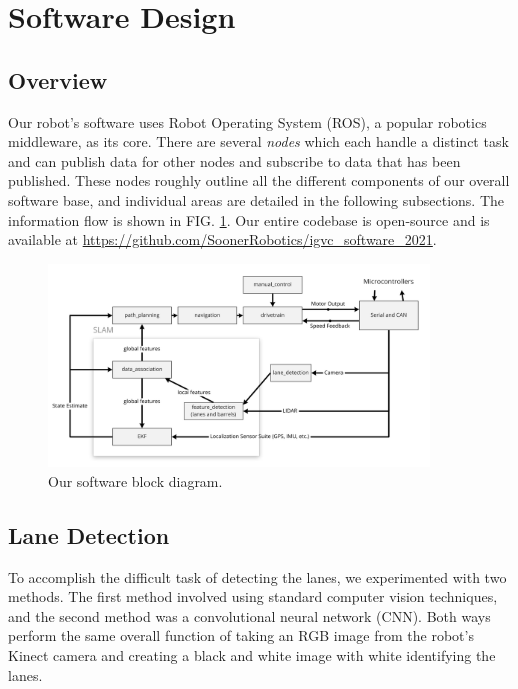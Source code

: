 \section{Software Design}

\subsection{Overview}

Our robot's software uses Robot Operating System (ROS), a popular robotics middleware, as its core. There are several \textit{nodes} which each handle a distinct task and can publish data for other nodes and subscribe to data that has been published. These nodes roughly outline all the different components of our overall software base, and individual areas are detailed in the following subsections. The information flow is shown in FIG. \ref{fig:block:software}. Our entire codebase is open-source and is available at \url{https://github.com/SoonerRobotics/igvc_software_2021}.

\begin{figure}[h]
    \centering
    \includegraphics[width=0.9\textwidth]{images/software/software_block.png}
    \caption{Our software block diagram.}
    \label{fig:block:software}
\end{figure}

\subsection{Lane Detection}

To accomplish the difficult task of detecting the lanes, we experimented with two methods. The first method involved using standard computer vision techniques, and the second method was a convolutional neural network (CNN). Both ways perform the same overall function of taking an RGB image from the robot's Kinect camera and creating a black and white image with white identifying the lanes. 

